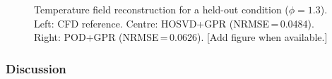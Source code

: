\FloatBarrier
\begin{figure}[htbp]
    \centering
    \caption{Temperature field reconstruction for a held-out condition ($\phi = 1.3$). Left: CFD reference. Centre: HOSVD+GPR (NRMSE\,=\,0.0484). Right: POD+GPR (NRMSE\,=\,0.0626). [Add figure when available.]}
    \label{fig:ulb_temp_reconstruction}
\end{figure}
\FloatBarrier

\subsubsection*{Discussion}

